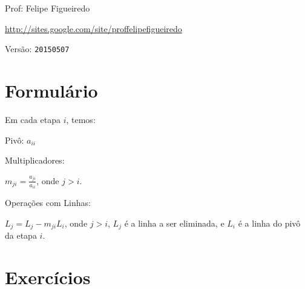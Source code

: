 \documentclass[a4paper]{article}
\begin{document}
\parbox[c]{.825\textwidth}{\raggedright%
{Prof: Felipe Figueiredo\par}
{\url{http://sites.google.com/site/proffelipefigueiredo}\par}
}

Versão: \verb|20150507|



\section{Formulário}

Em cada etapa $i$, temos:

Pivô: $a_{ii}$

Multiplicadores:

$m_{ji} = \frac{a_{ji}}{a_{ii}}$, onde $j>i$.

Operações com Linhas:

$L_j = L_j - m_{ji}L_i$, onde $j>i$, $L_j$ é a linha a ser eliminada,
e $L_i$ é a linha do pivô da etapa $i$.

\section{Exercícios}
\end{document}
